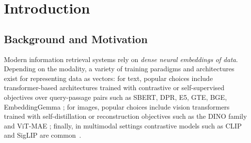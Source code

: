 \documentclass[preprint]{article}
\newcommand{\kiril}[1]{{\color{purple}\textsf{[KB: #1]}}}
\begin{document}


\section{Introduction}\label{sec:intro}

\subsection{Background and Motivation}\label{subsec:background}
Modern information retrieval systems rely on \emph{dense neural embeddings of data}.
Depending on the modality, a variety of training paradigms and architectures exist for representing data as vectors: for text, popular choices include transformer-based architectures trained with contrastive or self-supervised objectives over query-passage pairs such as SBERT, DPR, E5, GTE, BGE, EmbeddingGemma \cite{reimers2019sentence,KarpukhinEtAl2020,wang2022e5,li2023gte,chen2024bgem3,vera2025embeddinggemma}; for images, popular choices include vision transformers trained with self-distillation or reconstruction objectives such as the DINO family and ViT-MAE \cite{caron21dino, OquabEtAl2023,he2022mae,simeoni2025dinov3}; finally, in multimodal settings contrastive models such as CLIP and SigLIP are common~\cite{radford21clip,zhai23siglip,tschannen2025siglip2}.
\end{document}
